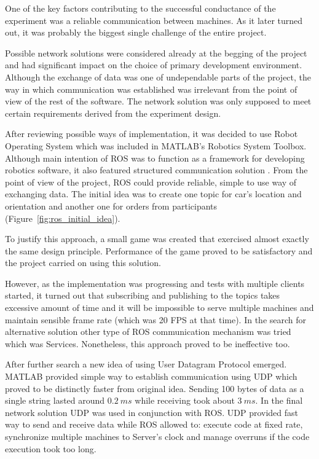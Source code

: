 \documentclass[11pt,english,twoside]{article}
\begin{document}
One of the key factors contributing to the successful conductance of the experiment was a reliable communication between machines. As it later turned out, it was probably the biggest single challenge of the entire project.
\par
Possible network solutions were considered already at the begging of the project and had significant impact on the choice of primary development environment. Although the exchange of data was one of undependable parts of the project, the way in which communication was established was irrelevant from the point of view of the rest of the software. The network solution was only supposed to meet certain requirements derived from the experiment design.
\par
 After reviewing possible ways of implementation, it was decided to use Robot Operating System which was included in MATLAB's Robotics System Toolbox. Although main intention of ROS was to function as a framework for developing robotics software, it also featured  structured communication solution \citep{quigley2009ros}. From the point of view of the project, ROS could provide reliable, simple to use way of exchanging data. The initial idea was to create one topic for car's location and orientation and another one for orders from participants (Figure~\ref{fig:ros_initial_idea}). 
\par
To justify this approach, a small game was created that exercised almost exactly the same design principle. Performance of the game proved to be satisfactory and the project carried on using this solution. 
\par
However, as the implementation was progressing and tests with multiple clients started, it turned out that subscribing and publishing to the topics takes excessive amount of time and it will be impossible to serve multiple machines and maintain sensible frame rate (which was 20 FPS at that time). In the search for alternative solution other type of ROS communication mechanism was tried which was Services. Nonetheless, this approach proved to be ineffective too. 
\par
After further search a new idea of using User Datagram Protocol emerged. MATLAB provided simple way to establish communication using UDP which proved to be distinctly faster from original idea. Sending 100 bytes of data as a single string lasted around $0.2\:ms$ while receiving took about $3\:ms$. 
In the final network solution UDP was used in conjunction with ROS. UDP provided fast way to send and receive data while ROS allowed to: execute code at fixed rate, synchronize multiple machines to Server's clock and manage overruns if the code execution took too long. 
\end{document}
